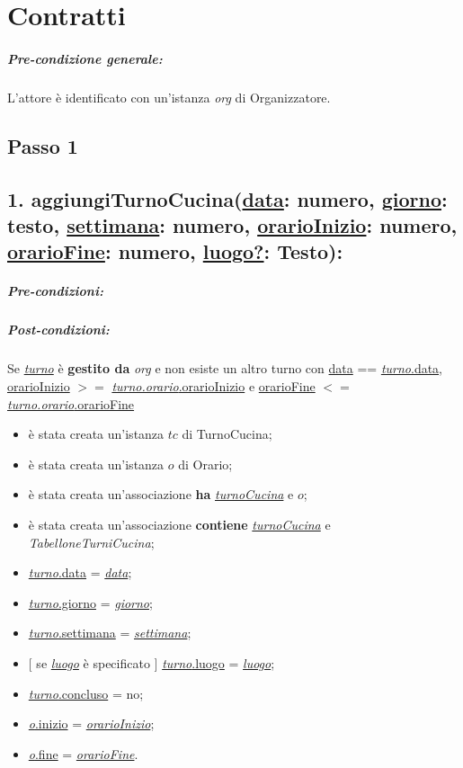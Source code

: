 \chapter{Contratti}
\paragraph{Pre-condizione generale:} L'attore è identificato con un'istanza \textit{org} di Organizzatore.

\section{Passo 1}
\section*{1. aggiungiTurnoCucina(\underline{data}: numero, \underline{giorno}: testo, \underline{settimana}: numero, \underline{orarioInizio}: numero, \underline{orarioFine}: numero, \underline{luogo?}: Testo):}

\paragraph{Pre-condizioni:} 


\paragraph{Post-condizioni:} Se \underline{\textit{turno}} è \textbf{gestito da} \textit{org} e non esiste un altro turno con \underline{data} == \underline{\textit{turno}.data}, \underline{orarioInizio} $>=$ \underline{\textit{turno.orario}.orarioInizio} e \underline{orarioFine} $<=$ \underline{\textit{turno.orario}.orarioFine}

\begin{itemize}
    \item è stata creata un'istanza $tc$ di TurnoCucina;
    \item è stata creata un'istanza $o$ di Orario;
    \item è stata creata un'associazione \textbf{ha} \underline{\textit{turnoCucina}} e $o$;
    \item è stata creata un'associazione \textbf{contiene} \underline{\textit{turnoCucina}} e \textit{TabelloneTurniCucina};
    \item \underline{\textit{turno}.data} = \underline{\textit{data}};
    \item \underline{\textit{turno}.giorno} = \underline{\textit{giorno}};
    \item \underline{\textit{turno}.settimana} = \underline{\textit{settimana}};
    \item $[$ se \underline{\textit{luogo}} è specificato $]$ \underline{\textit{turno}.luogo} = \underline{\textit{luogo}};
    \item \underline{\textit{turno}.concluso}  = no;
    \item \underline{\textit{o}.inizio}  = \underline{\textit{orarioInizio}};
    \item \underline{\textit{o}.fine}  = \underline{\textit{orarioFine}}.
    
\end{itemize}

